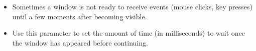 \begin{itemize}
\item Sometimes a window is not ready to receive events (mouse clicks, key presses) until a few moments after becoming visible.
\item Use this parameter to set the amount of time (in milliseconds) to wait once the window has appeared before continuing.
\end{itemize}

